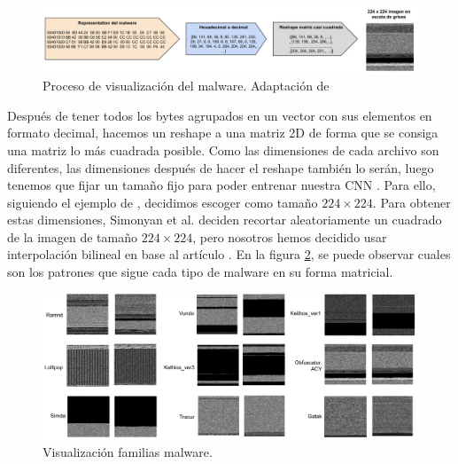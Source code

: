 \begin{figure}[h]
    \begin{center}
    \includegraphics[width=\textwidth]{img/visualMalware.png}
    \end{center}
    \caption{Proceso de visualización del malware. Adaptación de \citep{nataraj2011malware}}
    \label{img: visualMalware}
\end{figure}

Después de tener todos los bytes agrupados en un vector con sus elementos en formato decimal, hacemos un reshape a una matriz 2D de forma que se consiga una matriz lo más cuadrada posible. Como las dimensiones de cada archivo son diferentes, las dimensiones después de hacer el reshape también lo serán, luego tenemos que fijar un tamaño fijo para poder entrenar nuestra CNN \citep{kumar2021mcft}. Para ello, siguiendo el ejemplo de \citep{kalash2018malware}, decidimos escoger como tamaño $224 \times 224$. Para obtener estas dimensiones, Simonyan et al. \citep{simonyan2014very} deciden recortar aleatoriamente un cuadrado de la imagen de tamaño $224 \times 224$, pero nosotros hemos decidido usar interpolación bilineal en base al artículo \citep{he2019malware}. En la figura \ref{img: visualFamilias}, se puede observar cuales son los patrones que sigue cada tipo de malware en su forma matricial.

\begin{figure}[h]
    \begin{center}
    \includegraphics[width=\textwidth]{img/visualFamilias.png}
    \end{center}
    \caption{Visualización familias malware.}
    \label{img: visualFamilias}
\end{figure}


